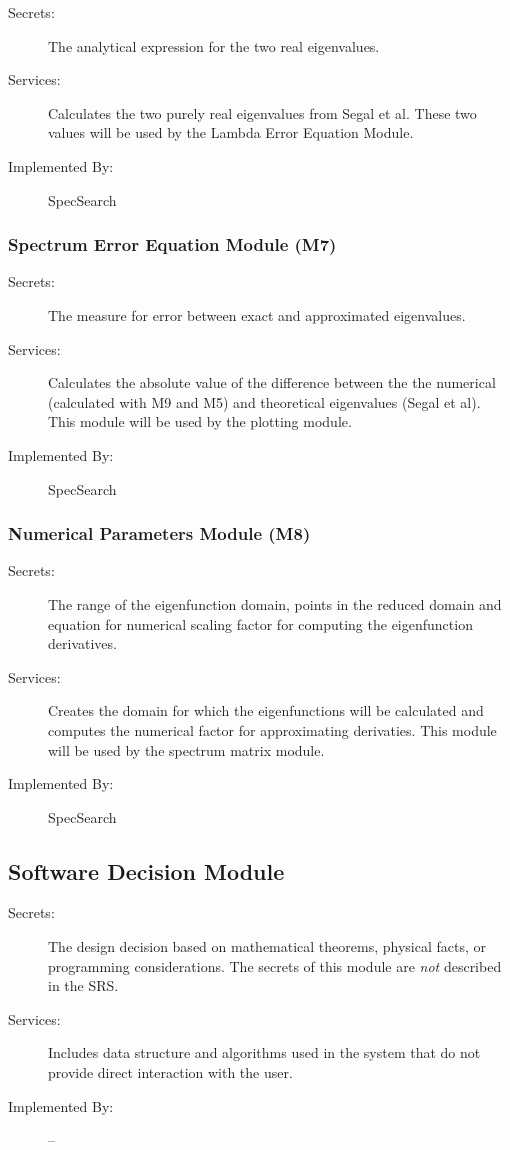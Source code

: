 \documentclass[12pt, titlepage]{article}
\begin{document}
\begin{description}
	\item[Secrets:]The analytical expression for the two real eigenvalues. 
	\item[Services:]Calculates the two purely real eigenvalues from 
	Segal et al. These two values will be used by the Lambda Error Equation 
	Module. 
	\item[Implemented By:] SpecSearch
\end{description}

\subsubsection{Spectrum Error Equation Module (M7)}

\begin{description}
	\item[Secrets:] The measure for error between exact and approximated 
	eigenvalues.
	\item[Services:]Calculates the absolute value of the difference between the 
	the numerical (calculated with M9 and M5) and 
	theoretical eigenvalues (Segal et al). This module will be used by the 
	plotting module. 
	\item[Implemented By:] SpecSearch
\end{description} 

\subsubsection{Numerical Parameters Module (M8)} 

\begin{description}
	\item[Secrets:] The range of the eigenfunction domain, points in the 
	reduced domain and equation for numerical scaling factor for computing the 
	eigenfunction derivatives. 
	\item[Services:] Creates the domain for which the eigenfunctions will be 
	calculated and computes the numerical factor for approximating derivaties. 
	This module will be used by the spectrum matrix module. 
	\item[Implemented By:] SpecSearch
\end{description}

\subsection{Software Decision Module}

\begin{description}
\item[Secrets:] The design decision based on mathematical theorems, physical
  facts, or programming considerations. The secrets of this module are
  \emph{not} described in the SRS.
\item[Services:] Includes data structure and algorithms used in the system that
  do not provide direct interaction with the user. 
\item[Implemented By:] --
\end{description}
\end{document}
